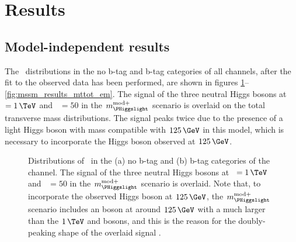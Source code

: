 \section{Results}
\label{sec:mssm_results}
\subsection{Model-independent results}
\label{sec:mssm_results_modelindep}
The \mTtot~distributions in the no b-tag and b-tag
categories of all channels, after the fit to the observed
data has been performed, are shown in figures \ref{fig:mssm_results_mttot_mt}--\ref{fig:mssm_results_mttot_em}.
The signal of the three neutral Higgs bosons at \mA~$=1\,\TeV$ and \tanb~$=50$ in the $m_{\PHiggslight}^{\text{mod+}}$ scenario is overlaid 
on the total transverse mass distributions. The signal peaks twice due to the presence of a light Higgs boson
with mass compatible with $125\,\GeV$ in this model, which is necessary to incorporate the Higgs boson
observed at $125\,\GeV$.

\begin{figure}[h!]
\begin{center}
\end{center}
\caption[Distributions of \mTtot~in the no b-tag and b-tag categories
of the \mutau channel.]{Distributions of \mTtot~in the (a) no b-tag and (b) b-tag categories 
of the \mutau channel. The signal of the three neutral Higgs bosons at \mA~$=1\,\TeV$ 
and \tanb~$=50$ in the $m_{\PHiggslight}^{\text{mod+}}$ scenario is overlaid. Note that, to incorporate
the observed Higgs boson at $125\,\GeV$, the $m_{\PHiggslight}^{\text{mod+}}$ scenario includes an \PHiggslight boson
at around $125\,\GeV$ with a much larger \xsbr than the $1\,\TeV$ \PHiggs and \PHiggsps bosons, and this is
the reason for the doubly-peaking shape of the overlaid signal \cite{CMS-PAS-HIG-16-037}.}
\label{fig:mssm_results_mttot_mt}
\end{figure}


